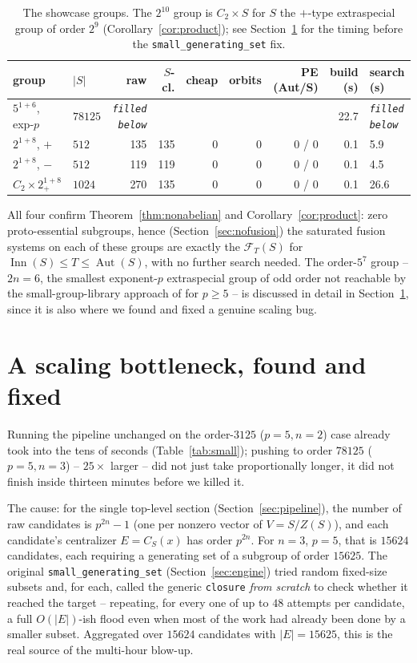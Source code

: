 \documentclass[11pt]{article}
\theoremstyle{remark}
\begin{document}
\begin{table}[htbp]
\centering
\caption{The showcase groups. The $2^{10}$ group is $C_2 \times S$ for $S$
the $+$-type extraspecial group of order $2^9$ (Corollary~\ref{cor:product});
see Section~\ref{sec:bottleneck} for the timing before the
\texttt{small\_generating\_set} fix.}
\label{tab:showcase}
\begin{tabular}{@{}llrrrrrrl@{}}
\toprule
group & $|S|$ & raw & $S$-cl. & cheap & orbits & PE (Aut/S) & build (s) & search (s) \\
\midrule
$5^{1+6}$, exp-$p$ & $78125$ & \texttt{\emph{filled below}} & & & & & 22.7 & \texttt{\emph{filled below}} \\
$2^{1+8}$, $+$     & $512$   & 135  & 135 & 0 & 0 & 0 / 0 & 0.1 & 5.9 \\
$2^{1+8}$, $-$     & $512$   & 119  & 119 & 0 & 0 & 0 / 0 & 0.1 & 4.5 \\
$C_2 \times 2^{1+8}_+$ & $1024$ & 270 & 135 & 0 & 0 & 0 / 0 & 0.1 & 26.6 \\
\bottomrule
\end{tabular}
\end{table}

All four confirm Theorem~\ref{thm:nonabelian} and Corollary~\ref{cor:product}:
zero proto-essential subgroups, hence (Section~\ref{sec:nofusion}) the
saturated fusion systems on each of these groups are exactly the
$\mathcal{F}_T(S)$ for $\operatorname{Inn}(S) \le T \le
\operatorname{Aut}(S)$, with no further search needed. The order-$5^7$
group -- $2n=6$, the smallest exponent-$p$ extraspecial group of odd order
not reachable by the small-group-library approach of
\cite{parkersemeraro} for $p \ge 5$ -- is discussed in detail in
Section~\ref{sec:bottleneck}, since it is also where we found and fixed a
genuine scaling bug.

\section{A scaling bottleneck, found and fixed}
\label{sec:bottleneck}

Running the pipeline unchanged on the order-$3125$ ($p=5,n=2$) case already
took into the tens of seconds (Table~\ref{tab:small}); pushing to order
$78125$ ($p=5,n=3$) -- $25\times$ larger -- did not just take proportionally
longer, it did not finish inside thirteen minutes before we killed it.

The cause: for the single top-level section (Section~\ref{sec:pipeline}),
the number of raw candidates is $p^{2n}-1$ (one per nonzero vector of
$V=S/Z(S)$), and each candidate's centralizer $E = C_S(x)$ has order
$p^{2n}$. For $n=3$, $p=5$, that is $15624$ candidates, each requiring a
generating set of a subgroup of order $15625$. The original
\texttt{small\_generating\_set} (Section~\ref{sec:engine}) tried random
fixed-size subsets and, for each, called the generic \texttt{closure}
\emph{from scratch} to check whether it reached the target -- repeating,
for every one of up to $48$ attempts per candidate, a full $O(|E|)$-ish
flood even when most of the work had already been done by a smaller
subset. Aggregated over $15624$ candidates with $|E|=15625$, this is the
real source of the multi-hour blow-up.
\end{document}
